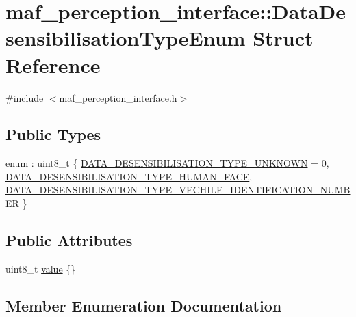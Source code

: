 \hypertarget{structmaf__perception__interface_1_1DataDesensibilisationTypeEnum}{}\section{maf\+\_\+perception\+\_\+interface\+:\+:Data\+Desensibilisation\+Type\+Enum Struct Reference}
\label{structmaf__perception__interface_1_1DataDesensibilisationTypeEnum}


{\ttfamily \#include $<$maf\+\_\+perception\+\_\+interface.\+h$>$}

\subsection*{Public Types}
\begin{DoxyCompactItemize}
\item 
enum \+: uint8\+\_\+t \{ \hyperlink{structmaf__perception__interface_1_1DataDesensibilisationTypeEnum_a5f0f9bcbd332a09d96053e2075c7a2d3a0207e13cd7221f93b83927dc0e77006b}{D\+A\+T\+A\+\_\+\+D\+E\+S\+E\+N\+S\+I\+B\+I\+L\+I\+S\+A\+T\+I\+O\+N\+\_\+\+T\+Y\+P\+E\+\_\+\+U\+N\+K\+N\+O\+WN} = 0, 
\hyperlink{structmaf__perception__interface_1_1DataDesensibilisationTypeEnum_a5f0f9bcbd332a09d96053e2075c7a2d3ad298cb77574a1c9d5bf3e8f1830a7c25}{D\+A\+T\+A\+\_\+\+D\+E\+S\+E\+N\+S\+I\+B\+I\+L\+I\+S\+A\+T\+I\+O\+N\+\_\+\+T\+Y\+P\+E\+\_\+\+H\+U\+M\+A\+N\+\_\+\+F\+A\+CE}, 
\hyperlink{structmaf__perception__interface_1_1DataDesensibilisationTypeEnum_a5f0f9bcbd332a09d96053e2075c7a2d3a7cf543f36a1bb637b5cd9a22323098d2}{D\+A\+T\+A\+\_\+\+D\+E\+S\+E\+N\+S\+I\+B\+I\+L\+I\+S\+A\+T\+I\+O\+N\+\_\+\+T\+Y\+P\+E\+\_\+\+V\+E\+C\+H\+I\+L\+E\+\_\+\+I\+D\+E\+N\+T\+I\+F\+I\+C\+A\+T\+I\+O\+N\+\_\+\+N\+U\+M\+B\+ER}
 \}
\end{DoxyCompactItemize}
\subsection*{Public Attributes}
\begin{DoxyCompactItemize}
\item 
uint8\+\_\+t \hyperlink{structmaf__perception__interface_1_1DataDesensibilisationTypeEnum_ab56704862758bd66e056e07f2b7af7e3}{value} \{\}
\end{DoxyCompactItemize}


\subsection{Member Enumeration Documentation}
\mbox{\label{structmaf__perception__interface_1_1DataDesensibilisationTypeEnum_a5f0f9bcbd332a09d96053e2075c7a2d3}} 
